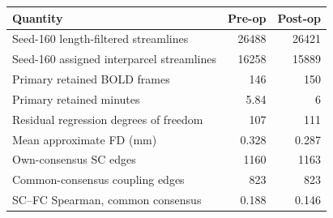 \begin{tabular}{lrr}
\toprule
Quantity & Pre-op & Post-op \\
\midrule
Seed-160 length-filtered streamlines & 26488 & 26421 \\
Seed-160 assigned interparcel streamlines & 16258 & 15889 \\
Primary retained BOLD frames & 146 & 150 \\
Primary retained minutes & 5.84 & 6 \\
Residual regression degrees of freedom & 107 & 111 \\
Mean approximate FD (mm) & 0.328 & 0.287 \\
Own-consensus SC edges & 1160 & 1163 \\
Common-consensus coupling edges & 823 & 823 \\
SC--FC Spearman, common consensus & 0.188 & 0.146 \\
\bottomrule
\end{tabular}
